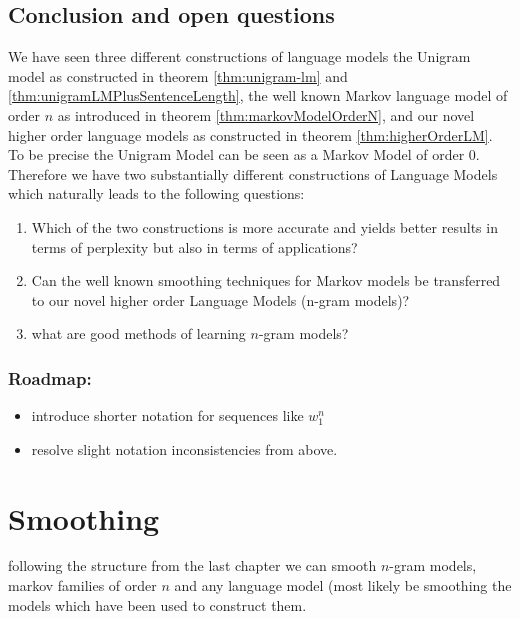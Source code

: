 \documentclass[•]{book}
\begin{document}
\section{Conclusion and open questions}
We have seen three different constructions of language models the Unigram model as constructed in theorem \ref{thm:unigram-lm} and \ref{thm:unigramLMPlusSentenceLength}, the well known Markov language model of order $n$ as introduced in theorem \ref{thm:markovModelOrderN}, and our novel higher order language models as constructed in theorem \ref{thm:higherOrderLM}.
To be precise the Unigram Model can be seen as a Markov Model of order $0$.
Therefore we have two substantially different constructions of Language Models which naturally leads to the following questions: 
\begin{enumerate}
\item Which of the two constructions is more accurate and yields better results in terms of perplexity but also in terms of applications?
\item Can the well known smoothing techniques for Markov models be transferred to our novel higher order Language Models (n-gram models)?
\item what are good methods of learning $n$-gram models?
\end{enumerate}




\subsection{Roadmap:}
\begin{itemize}
\item introduce shorter notation for sequences like $w_1^n$
\item resolve slight notation inconsistencies from above. 
\end{itemize}

\chapter{Smoothing}
following the structure from the last chapter we can smooth $n$-gram models, markov families of order $n$ and any language model (most likely be smoothing the models which have been used to construct them. 
\end{document}
